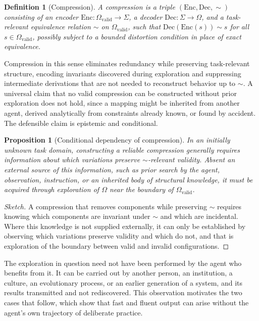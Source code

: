 \documentclass[11pt]{report}
\newtheorem{definition}{Definition}[chapter]
\newtheorem{proposition}{Proposition}[chapter]
\theoremstyle{remark}
\theoremstyle{definition}
\begin{document}
\begin{definition}[Compression]
A \emph{compression} is a triple $(\mathrm{Enc},\mathrm{Dec},\sim)$ consisting of an encoder $\mathrm{Enc}:\Omega_{\mathrm{valid}}\to\Sigma$, a decoder $\mathrm{Dec}:\Sigma\to\Omega$, and a task-relevant equivalence relation $\sim$ on $\Omega_{\mathrm{valid}}$, such that $\mathrm{Dec}(\mathrm{Enc}(s))\sim s$ for all $s\in\Omega_{\mathrm{valid}}$, possibly subject to a bounded distortion condition in place of exact equivalence.
\end{definition}

Compression in this sense eliminates redundancy while preserving task-relevant structure, encoding invariants discovered during exploration and suppressing intermediate derivations that are not needed to reconstruct behavior up to $\sim$. A universal claim that no valid compression can be constructed without prior exploration does not hold, since a mapping might be inherited from another agent, derived analytically from constraints already known, or found by accident. The defensible claim is epistemic and conditional.

\begin{proposition}[Conditional dependency of compression]\label{prop:compdep}
In an initially unknown task domain, constructing a reliable compression generally requires information about which variations preserve $\sim$-relevant validity. Absent an external source of this information, such as prior search by the agent, observation, instruction, or an inherited body of structural knowledge, it must be acquired through exploration of $\Omega$ near the boundary of $\Omega_{\mathrm{valid}}$.
\end{proposition}

\begin{proof}[Sketch]
A compression that removes components while preserving $\sim$ requires knowing which components are invariant under $\sim$ and which are incidental. Where this knowledge is not supplied externally, it can only be established by observing which variations preserve validity and which do not, and that is exploration of the boundary between valid and invalid configurations.
\end{proof}

The exploration in question need not have been performed by the agent who benefits from it. It can be carried out by another person, an institution, a culture, an evolutionary process, or an earlier generation of a system, and its results transmitted and not rediscovered. This observation motivates the two cases that follow, which show that fast and fluent output can arise without the agent's own trajectory of deliberate practice.
\end{document}
